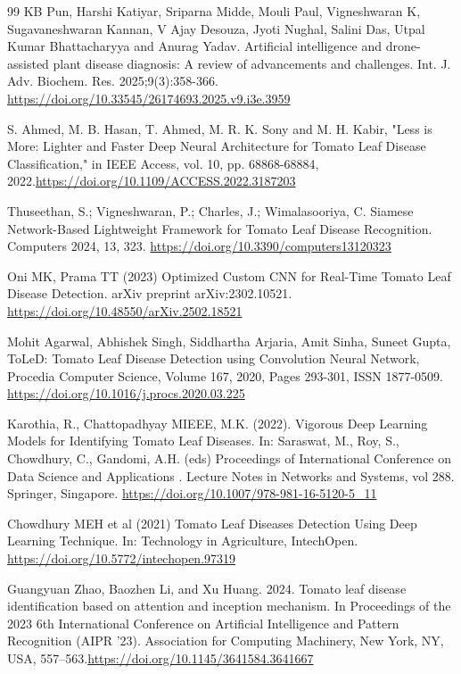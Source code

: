 \documentclass[pdflatex,sn-mathphys-num,iicol]{sn-jnl} %
\theoremstyle{thmstyleone}
\theoremstyle{thmstyletwo}
\theoremstyle{thmstylethree}
\begin{document}
\begin{thebibliography}{99}
 KB Pun, Harshi Katiyar, Sriparna Midde, Mouli Paul, Vigneshwaran K, Sugavaneshwaran Kannan, V Ajay Desouza, Jyoti Nughal, Salini Das, Utpal Kumar Bhattacharyya and Anurag Yadav. Artificial intelligence and drone-assisted plant disease diagnosis: A review of advancements and challenges. Int. J. Adv. Biochem. Res. 2025;9(3):358-366. \url{https://doi.org/10.33545/26174693.2025.v9.i3e.3959}



 S. Ahmed, M. B. Hasan, T. Ahmed, M. R. K. Sony and M. H. Kabir, "Less is More: Lighter and Faster Deep Neural Architecture for Tomato Leaf Disease Classification," in IEEE Access, vol. 10, pp. 68868-68884, 2022.\url{https://doi.org/10.1109/ACCESS.2022.3187203}

 Thuseethan, S.; Vigneshwaran, P.; Charles, J.; Wimalasooriya, C. Siamese Network-Based Lightweight Framework for Tomato Leaf Disease Recognition. Computers 2024, 13, 323. \url{https://doi.org/10.3390/computers13120323}

 Oni MK, Prama TT (2023) Optimized Custom CNN for Real-Time Tomato Leaf Disease
Detection. arXiv preprint arXiv:2302.10521.
 \url{https://doi.org/10.48550/arXiv.2502.18521}


 Mohit Agarwal, Abhishek Singh, Siddhartha Arjaria, Amit Sinha, Suneet Gupta,
ToLeD: Tomato Leaf Disease Detection using Convolution Neural Network,
Procedia Computer Science,
Volume 167,
2020,
Pages 293-301,
ISSN 1877-0509. \url{https://doi.org/10.1016/j.procs.2020.03.225}

Karothia, R., Chattopadhyay MIEEE, M.K. (2022). Vigorous Deep Learning Models for Identifying Tomato Leaf Diseases. In: Saraswat, M., Roy, S., Chowdhury, C., Gandomi, A.H. (eds) Proceedings of International Conference on Data Science and Applications . Lecture Notes in Networks and Systems, vol 288. Springer, Singapore. \url{https://doi.org/10.1007/978-981-16-5120-5_11}

 Chowdhury MEH et al (2021) Tomato Leaf Diseases Detection Using Deep Learning Technique. In: Technology in Agriculture, IntechOpen. \url{https://doi.org/10.5772/intechopen.97319}

 Guangyuan Zhao, Baozhen Li, and Xu Huang. 2024. Tomato leaf disease identification based on attention and inception mechanism. In Proceedings of the 2023 6th International Conference on Artificial Intelligence and Pattern Recognition (AIPR '23). Association for Computing Machinery, New York, NY, USA, 557–563.\url{https://doi.org/10.1145/3641584.3641667}


\end{thebibliography}
\end{document}

